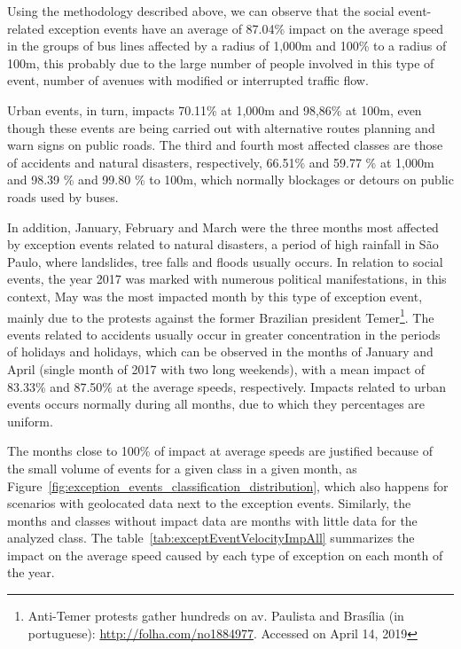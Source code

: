 \documentclass[runningheads]{llncs}
\begin{document}
Using the methodology described above, we can observe that the social event-related exception events have an average of 87.04\% impact on the average speed in the groups of bus lines affected by a radius of 1,000m and 100\% to a radius of 100m, this probably due to the large number of people involved in this type of event, number of avenues with modified or interrupted traffic flow.

Urban events, in turn, impacts 70.11\% at 1,000m and 98,86\% at 100m, even though these events are being carried out with alternative routes planning and warn signs on public roads. The third and fourth most affected classes are those of accidents and natural disasters, respectively, 66.51\% and 59.77 \% at 1,000m and 98.39 \% and 99.80 \% to 100m, which normally blockages or detours on public roads used by buses.

In addition, January, February and March were the three months most affected by exception events related to natural disasters, a period of high rainfall in São Paulo, where landslides, tree falls and floods usually occurs. In relation to social events, the year 2017 was marked with numerous political manifestations, in this context, May was the most impacted month by this type of exception event, mainly due to the protests against the former Brazilian president Temer\footnote{Anti-Temer protests gather hundreds on av. Paulista and Brasília (in portuguese): \url{http://folha.com/no1884977}. Accessed on April 14, 2019}. The events related to accidents usually occur in greater concentration in the periods of holidays and holidays, which can be observed in the months of January and April (single month of 2017 with two long weekends), with a mean impact of 83.33\% and 87.50\% at the average speeds, respectively. Impacts related to urban events occurs normally during all months, due to which they percentages are uniform.

The months close to 100\% of impact at average speeds are justified because of the small volume of events for a given class in a given month, as Figure~\ref{fig:exception_events_classification_distribution}, which also happens for scenarios with geolocated data next to the exception events. Similarly, the months and classes without impact data are months with little data for the analyzed class. The table~\ref{tab:exceptEventVelocityImpAll} summarizes the impact on the average speed caused by each type of exception on each month of the year. 
\end{document}
